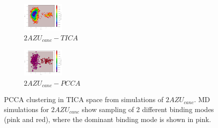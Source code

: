 \begin{figure}[!ht]
\centering
\begin{subfigure}{.5\textwidth}
  \centering
  \includegraphics[width=.9\linewidth]{chapter4/2AZU_canc/2AZU_canc-tica.pdf}
  \caption{$2AZU_{canc}-TICA$}
  \label{sup:2AZU_canc-tica}
\end{subfigure}%
\begin{subfigure}{.5\textwidth}
  \centering
  \includegraphics[width=.9\linewidth]{chapter4/2AZU_canc/2AZU_canc-pcca.pdf}
  \caption{$2AZU_{canc}-PCCA$}
  \label{sup:2AZU_canc-pcca}
\end{subfigure}
\caption{PCCA clustering in TICA space from simulations of $2AZU_{canc}$. MD simulations for $2AZU_{canc}$ show sampling of 2 different binding modes (pink and red), where the dominant binding mode is shown in pink.}
\label{sup:2AZU_canc-cluster}
\end{figure}

